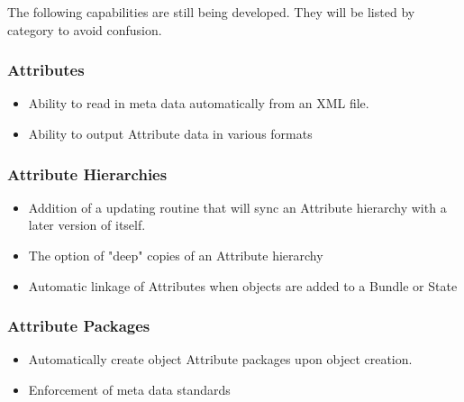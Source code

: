 %

The following capabilities are still being developed.  They will be listed by category to avoid confusion.
 
\subsubsection{Attributes}

\begin{itemize}
\item Ability to read in meta data automatically from an XML file.
\item Ability to output Attribute data in various formats
\end{itemize}

\subsubsection{Attribute Hierarchies}

\begin{itemize}
\item Addition of a updating routine that will sync an Attribute hierarchy with a later version of itself.
\item The option of "deep" copies of an Attribute hierarchy
\item Automatic linkage of Attributes when objects are added to a Bundle or State
\end{itemize}

\subsubsection{Attribute Packages}

\begin{itemize}
\item Automatically create object Attribute packages upon object creation.
\item Enforcement of meta data standards
\end{itemize}
